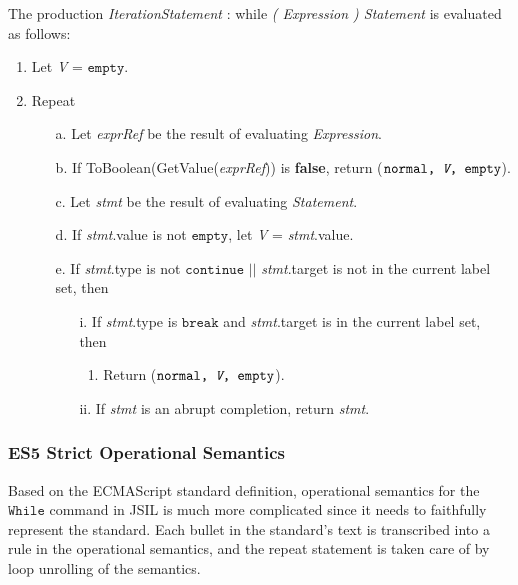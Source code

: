 \documentclass[a4paper,11pt,twoside]{report}
\begin{document}
The production \textit{IterationStatement} : while \textit{( Expression ) Statement} is evaluated as follows:
\begin{enumerate}
\item Let \textit{V} = $\texttt{empty}$.
\item Repeat
\begin{enumerate}
\item[a.] Let \textit{exprRef} be the result of evaluating \textit{Expression}.
\item[b.] If ToBoolean(GetValue(\textit{exprRef})) is \textbf{false}, return ($\texttt{normal, \textit{V}, empty}$).
\item[c.] Let \textit{stmt} be the result of evaluating \textit{Statement}.
\item[d.]If \textit{stmt}.value is not $\texttt{empty}$, let \textit{V} = \textit{stmt}.value.
\item[e.]If \textit{stmt}.type is not $\texttt{continue}$ $||$ \textit{stmt}.target is not in the current label set, then
\begin{enumerate}
\item[i.] If \textit{stmt}.type is $\texttt{break}$ and \textit{stmt}.target is in the current label set, then
\begin{enumerate} 
\item Return ($\texttt{normal, \textit{V}, empty}$).
\end{enumerate}
\item[ii.] If \textit{stmt} is an abrupt completion, return \textit{stmt}.
\end{enumerate}
\end{enumerate}
\end{enumerate}



\subsubsection{ES5 Strict Operational Semantics} 
Based on the ECMAScript standard definition, operational semantics for the $\mathtt{While}$ command in JSIL is much more complicated since it needs to faithfully represent the standard. Each bullet in the standard's text is transcribed into a rule in the operational semantics, and the repeat statement is taken care of by loop unrolling of the semantics.
\end{document}
